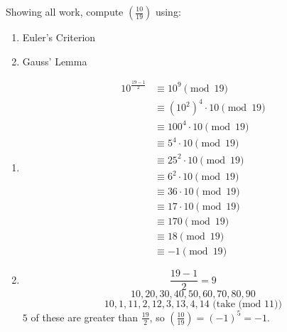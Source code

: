 \documentclass{article}
\begin{document}

\begin{problem}{}{}
    Showing all work, compute $\left(\frac{10}{19}\right)$ using:
    \begin{enumerate}[label=\textbf{(\alph*)}]
        \item Euler's Criterion
        \item Gauss' Lemma
    \end{enumerate}
\end{problem}
\begin{solution}{}{}
    \begin{enumerate}[label=\textbf{(\alph*)}]
        \item 
        \begin{align*}
            10^{\frac{19-1}{2}}&\equiv10^9\pmod{19}\\
            &\equiv (10^2)^4\cdot10\pmod{19}\\
            &\equiv 100^4\cdot10\pmod{19}\\
            &\equiv 5^4\cdot10\pmod{19}\\
            &\equiv 25^2\cdot10\pmod{19}\\
            &\equiv 6^2\cdot10\pmod{19}\\
            &\equiv 36\cdot10\pmod{19}\\
            &\equiv 17\cdot10\pmod{19}\\
            &\equiv 170\pmod{19}\\
            &\equiv 18\pmod{19}\\
            &\equiv -1\pmod{19}
        \end{align*}
        \item 
        \[\frac{19-1}{2}=9\]
        \[10,20,30,40,50,60,70,80,90\]
        \[10,1,11,2,12,3,13,4,14 \text{ (take (mod 11))}\]
        $5$ of these are greater than $\frac{19}{2}$, so $\left(\frac{10}{19}\right)=(-1)^5=-1$.
    \end{enumerate}
\end{solution}
\end{document}
